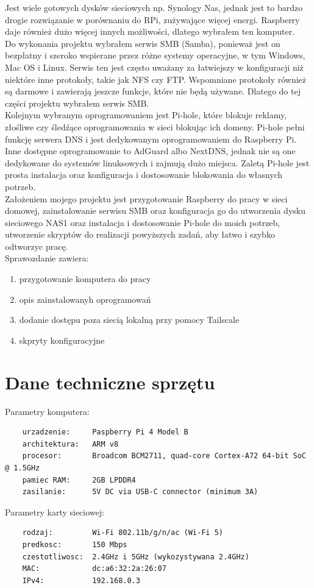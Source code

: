 \documentclass{article}
\begin{document}
Jest wiele gotowych dysków sieciowych np. Synology Nas, jednak jest to bardzo drogie rozwiązanie w porównaniu do RPi, zużywające więcej energi. Raspberry daje również dużo więcej innych możliwości, dlatego wybrałem ten komputer.\\

Do wykonania projektu wybrałem serwis SMB (Samba), ponieważ jest on bezpłatny i szeroko wspierane przez różne systemy operacyjne, w tym Windows, Mac OS i Linux. Serwis ten jest często uważany za łatwiejszy w konfiguracji niż niektóre inne protokoły, takie jak NFS czy FTP. Wspomniane protokoły również są darmowe i zawierają jeszcze funkcje, które nie będą używane. Dlatego do tej części projektu wybrałem serwis SMB.\\

Kolejnym wybranym oprogramowaniem jest Pi-hole, które blokuje reklamy, złośliwe czy śledźące oprogramowania w sieci blokując ich domeny. Pi-hole pełni funkcję serwera DNS i jest dedykowanym oprogramowaniem do Raspberry Pi. Inne dostępne oprogramowanie to AdGuard albo NextDNS, jednak nie są one dedykowane do systemów linuksowych i zajmują dużo miejsca. Zaletą Pi-hole jest prosta instalacja oraz konfiguracja i dostosowanie blokowania do własnych potrzeb.\\

Założeniem mojego projektu jest przygotowanie Raspberry do pracy w sieci domowej, zainstalowanie serwisu SMB oraz konfiguracja go do utworzenia dysku sieciowego NAS1 oraz instalacja i dostosowanie Pi-hole do moich potrzeb, utworzenie skryptów do realizacji powyższych zadań, aby łatwo i szybko odtworzyc pracę.\\
Sprawozdanie zawiera:
\begin{enumerate}[label=\textbullet]
  \item przygotowanie komputera do pracy
  \item opis zainstalowanyh oprogramowań
  \item dodanie dostępu poza siecią lokalną przy pomocy Tailscale
  \item skpryty konfiguracyjne
\end{enumerate}


\section{Dane techniczne sprzętu}
Parametry komputera:
\begin{lstlisting}
    urzadzenie:     Paspberry Pi 4 Model B
    architektura:   ARM v8
    procesor:       Broadcom BCM2711, quad-core Cortex-A72 64-bit SoC @ 1.5GHz
    pamiec RAM:     2GB LPDDR4
    zasilanie:      5V DC via USB-C connector (minimum 3A)
\end{lstlisting}
Parametry karty sieciowej:
\begin{lstlisting}
    rodzaj:         Wi-Fi 802.11b/g/n/ac (Wi-Fi 5)
    predkosc:       150 Mbps
    czestotliwosc:  2.4GHz i 5GHz (wykozystywana 2.4GHz)
    MAC:            dc:a6:32:2a:26:07
    IPv4:           192.168.0.3
\end{lstlisting}
\end{document}
